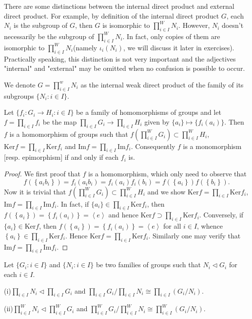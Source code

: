 There are some distinctions between the internal direct product and external direct product. For example, by definition of the internal direct product $G$, each $N_i$ is the subgroup of $G$, then $G$ is isomorphic to ${\prod}^W_{i\in I}N_i$. However, $N_i$ doesn't necessarily be the subgroup of ${\prod}^W_{i\in I}N_i$. In fact, only copies of them are isomorphic to ${\prod}^W_{i\in I}N_i$(namely $\iota_i(N_i)$, we will discuss it later in exercises). Practically speaking, this distinction is not very important and the adjectives "internal" and "external" may be omitted when no confusion is possible to occur.\par
We denote $G={\prod}^w_{i\in I}N_i$ as the internal weak direct product of the family of its subgroups $\{N_i:i\in I\}$.
\begin{theorem}
Let $\{f_i:G_i\to H_i:i\in I\}$ be a family of homomorphisms of groups and let $f=\prod_{i\in I}f_i$ be the map $\prod_{i\in I}G_i\to\prod_{i\in I}H_i$ given by $\{a_i\}\mapsto\{f_i(a_i)\}$. Then $f$ is a homomorphism of groups such that $f\left({\prod}^W_{i\in I}G_i\right)\subset{\prod}^W_{i\in I}H_i$, $\mathrm{Ker}f=\prod_{i\in I}\mathrm{Ker}f_i$ and $\mathrm{Im}f=\prod_{i\in I}\mathrm{Im}f_i$. Consequently $f$ is a monomorphism [resp. epimorphism] if and only if each $f_i$ is.
\end{theorem}
\begin{proof}
We first proof that $f$ is a homomorphism, which only need to observe that 
$$
f\left( \left\{ a_ib_i \right\} \right) =f_i\left( a_ib_i \right) =f_i\left( a_i \right) f_i\left( b_i \right) =f\left( \left\{ a_i \right\} \right) f\left( \left\{ b_i \right\} \right) .
$$
Now it is trivial that $f\left({\prod}^W_{i\in I}G_i\right)\subset{\prod}^W_{i\in I}H_i$ and we show $\mathrm{Ker}f=\prod_{i\in I}\mathrm{Ker}f_i$, $\mathrm{Im}f=\prod_{i\in I}\mathrm{Im}f_i$. In fact, if $\{a_i\}\in\prod_{i\in I}\mathrm{Ker}f_i$, then $f\left( \left\{ a_i \right\} \right) =\left\{ f_i\left( a_i \right) \right\} =\left< e \right> $ and hence $\mathrm{Ker}f\supset \prod_{i\in I}{\mathrm{Ker}f_i}$. Conversely, if $\{a_i\}\in\mathrm{Ker}f$, then $f\left( \left\{ a_i \right\} \right) =\left\{ f_i\left( a_i \right) \right\} =\left< e \right> $ for all $i\in I$, whence $\left\{ a_i \right\} \in \prod_{i\in I}{\mathrm{Ker}f_i}$. Hence $\mathrm{Ker}f=\prod_{i\in I}\mathrm{Ker}f_i$. Similarly one may verify that $\mathrm{Im}f=\prod_{i\in I}\mathrm{Im}f_i$.
\end{proof}
\begin{corollary}
Let $\{G_i:i\in I\}$ and $\{N_i:i\in I\}$ be two families of groups such that $N_i\lhd G_i$ for each $i\in I$.\par
(i)$\prod_{i\in I}{N_i}\lhd \prod_{i\in I}{G_i}$ and $\prod_{i\in I}{G_i}/\prod_{i\in I}{N_i}\cong \prod_{i\in I}{\left( G_i/N_i \right)}$.\par
(ii)${\prod}^W_{i\in I}{N_i}\lhd {\prod}^W_{i\in I}{G_i}$ and ${\prod}^W_{i\in I}{G_i}/{\prod}^W_{i\in I}{N_i}\cong {\prod}^W_{i\in I}{\left( G_i/N_i \right)}$.
\end{corollary}
